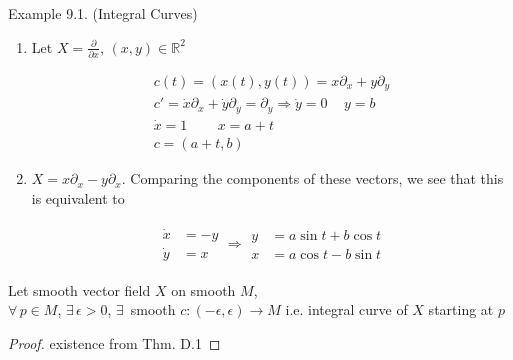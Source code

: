 Example 9.1.  (Integral Curves)

\begin{enumerate}
\item[(a)] Let $X = \frac{ \partial }{ \partial x}$, $(x,y) \in \mathbb{R}^2$ 

\[
\begin{gathered}
  c(t) = (x(t), y(t)) = x \partial_x + y\partial_y \\ 
  c' = \dot{x} \partial_x + \dot{y} \partial_y = \partial_y   \Longrightarrow \dot{y} = 0 \quad \, y = b \\
  \dot{x} = 1 \quad \quad \, x = a+t \\ 
  c = (a+t ,b) 
\end{gathered}
\]


\item[(b)] $X = x\partial_x - y \partial_x$.  Comparing the components of these vectors, we see that this is equivalent to 

\[
\begin{gathered}
  \begin{aligned}
    \dot{x} & = -y \\
    \dot{y}  & = x \end{aligned} \Longrightarrow \begin{aligned}
    y & = a \sin{t} + b\cos{t} \\ 
    x & = a\cos{t} - b\sin{t} \end{aligned}
\end{gathered}
\]



\end{enumerate}


\begin{proposition}[9.2] Let smooth vector field $X$ on smooth $M$, \\
$\forall \, p \in M$, $\exists \, \epsilon > 0 $, $\exists \, $ smooth $c:(-\epsilon, \epsilon) \to M$ i.e. integral curve of $X$ starting at $p$ \end{proposition}

\begin{proof}
  existence from Thm. D.1
\end{proof}


